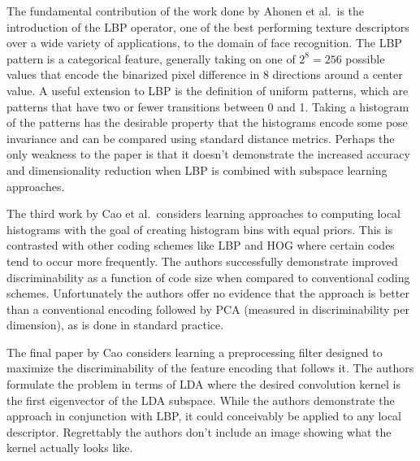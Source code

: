 \documentclass[12pt]{article}
\begin{document}
\par
The fundamental contribution of the work done by Ahonen et al.\ is the introduction of the LBP operator, one of the best performing texture descriptors over a wide variety of applications, to the domain of face recognition.
The LBP pattern is a categorical feature, generally taking on one of $2^8=256$ possible values that encode the binarized pixel difference in 8 directions around a center value.
A useful extension to LBP is the definition of uniform patterns, which are patterns that have two or fewer transitions between 0 and 1.
Taking a histogram of the patterns has the desirable property that the histograms encode some pose invariance and can be compared using standard distance metrics.
Perhaps the only weakness to the paper is that it doesn't demonstrate the increased accuracy and dimensionality reduction when LBP is combined with subspace learning approaches.
\par
The third work by Cao et al.\ considers learning approaches to computing local histograms with the goal of creating histogram bins with equal priors.
This is contrasted with other coding schemes like LBP and HOG where certain codes tend to occur more frequently.
The authors successfully demonstrate improved discriminability as a function of code size when compared to conventional coding schemes.
Unfortunately the authors offer no evidence that the approach is better than a conventional encoding followed by PCA (measured in discriminability per dimension), as is done in standard practice.
\par
The final paper by Cao considers learning a preprocessing filter designed to maximize the discriminability of the feature encoding that follows it.
The authors formulate the problem in terms of LDA where the desired convolution kernel is the first eigenvector of the LDA subspace.
While the authors demonstrate the approach in conjunction with LBP, it could conceivably be applied to any local descriptor.
Regrettably the authors don't include an image showing what the kernel actually looks like.
\end{document}
